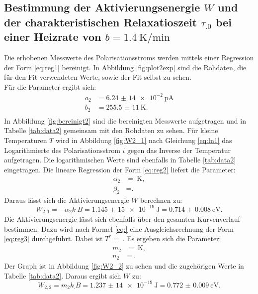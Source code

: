 \subsection{Bestimmung der Aktivierungsenergie $W$ und der charakteristischen Relaxatioszeit $\tau_.0$ bei einer Heizrate von $b=\SI{1,4}{\kelvin\per\minute}$}

Die erhobenen Messwerte des Polarisationsstroms werden mittels einer Regression der Form \eqref{eq:reg1} bereinigt. In Abbildung \ref{fig:plot2exp} sind die Rohdaten, die für den Fit verwendeten Werte, sowie der Fit selbst zu sehen.\\
Für die Parameter ergibt sich:
\begin{align*}
a_2&=\SI{6,24(14)e-2}{\pico\ampere}\\
b_2&=\SI{255,5(11)}{\kelvin}\text{.}\\
\end{align*}
In Abbildung \ref{fig:bereinigt2} sind die bereinigten Messwerte aufgetragen und in Tabelle \ref{tab:data2} gemeinsam mit den Rohdaten zu sehen.
Für kleine Temperaturen $T$ wird in Abbildung \ref{fig:W2_1} nach Gleichung \eqref{eq:ln1} das Logarithmierte des Polarisationsstrom $i$ gegen das Inverse der Temperatur aufgetragen. Die logarithmischen Werte sind ebenfalls in Tabelle \ref{tab:data2} eingetragen.
Die lineare Regression der Form \eqref{eq:reg2} liefert die Parameter:
\begin{align*}
\alpha_2&=\SI{}{\kelvin},\\
\beta_2 &= \text{.}
\end{align*}
Daraus lässt sich die Aktivierungsenergie $W$ berechnen zu:
\[
W_{2,1} = -\alpha_2 k_.B =\SI{1,145(15)e-19}{\joule}=\SI{0.714(8)}{\electronvolt}\text{.}
\]
Die Aktivierungsenergie lässt sich ebenfalls über den gesamten Kurvenverlauf bestimmen. Dazu wird nach Formel \eqref{eq:} eine Ausgleichsrechnung der Form \eqref{eq:reg3} durchgeführt. Dabei ist $T^*=\SI{}{}$. Es ergeben sich die Parameter:
\begin{align*}
m_2&=\SI{}{\kelvin},\\
n_2&=\SI{}{}\text{.}
\end{align*}
Der Graph ist in Abbildung \ref{fig:W2_2} zu sehen und die zugehörigen Werte in Tabelle \ref{tab:data2}.
Daraus ergibt sich $W$ zu:
\[
W_{2,2} = m_2 k_.B =\SI{1,237(14)e-19}{\joule}=\SI{0.772(9)}{\electronvolt}\text{.}
\]

